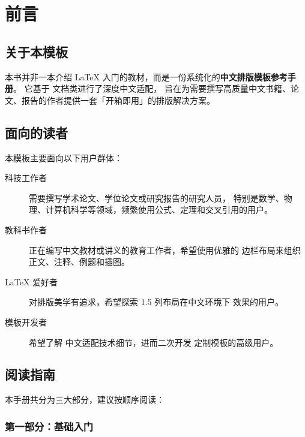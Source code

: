 \chapter*{前言}

\section*{关于本模板}

本书并非一本介绍 \LaTeX{} 入门的教材，而是一份系统化的\textbf{中文排版模板参考手册}。
它基于  文档类进行了深度中文适配，
旨在为需要撰写高质量中文书籍、论文、报告的作者提供一套「开箱即用」的排版解决方案。


\section*{面向的读者}

本模板主要面向以下用户群体：

\begin{description}
    \item[科技工作者] 需要撰写学术论文、学位论文或研究报告的研究人员，
        特别是数学、物理、计算机科学等领域，频繁使用公式、定理和交叉引用的用户。
    \item[教科书作者] 正在编写中文教材或讲义的教育工作者，希望使用优雅的
        边栏布局来组织正文、注释、例题和插图。
    \item[\LaTeX{} 爱好者] 对排版美学有追求，希望探索 1.5 列布局在中文环境下
        效果的用户。
    \item[模板开发者] 希望了解  中文适配技术细节，进而二次开发
        定制模板的高级用户。
\end{description}


\section*{阅读指南}

本手册共分为三大部分，建议按顺序阅读：

\subsection*{第一部分：基础入门}

